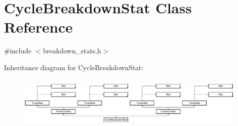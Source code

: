 \hypertarget{classCycleBreakdownStat}{\section{Cycle\-Breakdown\-Stat Class Reference}
\label{classCycleBreakdownStat}
}


{\ttfamily \#include $<$breakdown\-\_\-stats.\-h$>$}

Inheritance diagram for Cycle\-Breakdown\-Stat\-:\begin{figure}[H]
\begin{center}
\leavevmode
\includegraphics[height=2.554744cm]{classCycleBreakdownStat}
\end{center}
\end{figure}
